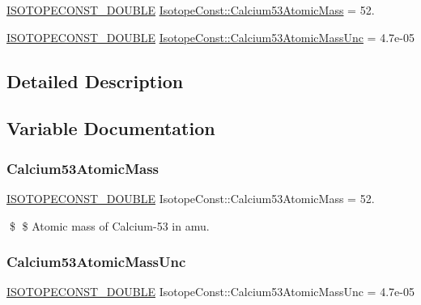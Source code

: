 \begin{DoxyCompactItemize}
\item 
\mbox{\hyperlink{group___isotope_const-_macros_ga8f45a7272ce02c0b4c65c44636ed719a}{I\+S\+O\+T\+O\+P\+E\+C\+O\+N\+S\+T\+\_\+\+D\+O\+U\+B\+LE}} \mbox{\hyperlink{group___isotope_const-_calcium-_ca53_ga8e71eb7b353aab0e8ed5a5073c9630cb}{Isotope\+Const\+::\+Calcium53\+Atomic\+Mass}} = 52.
\item 
\mbox{\hyperlink{group___isotope_const-_macros_ga8f45a7272ce02c0b4c65c44636ed719a}{I\+S\+O\+T\+O\+P\+E\+C\+O\+N\+S\+T\+\_\+\+D\+O\+U\+B\+LE}} \mbox{\hyperlink{group___isotope_const-_calcium-_ca53_ga5c5bef984e604d365d8e1a755ed00408}{Isotope\+Const\+::\+Calcium53\+Atomic\+Mass\+Unc}} = 4.\+7e-\/05
\end{DoxyCompactItemize}


\subsection{Detailed Description}


\subsection{Variable Documentation}
\mbox{\label{group___isotope_const-_calcium-_ca53_ga8e71eb7b353aab0e8ed5a5073c9630cb}} 
\subsubsection{\texorpdfstring{Calcium53\+Atomic\+Mass}{Calcium53AtomicMass}}
{\footnotesize\ttfamily \mbox{\hyperlink{group___isotope_const-_macros_ga8f45a7272ce02c0b4c65c44636ed719a}{I\+S\+O\+T\+O\+P\+E\+C\+O\+N\+S\+T\+\_\+\+D\+O\+U\+B\+LE}} Isotope\+Const\+::\+Calcium53\+Atomic\+Mass = 52.}

\$ \$ Atomic mass of Calcium-\/53 in amu. \mbox{\label{group___isotope_const-_calcium-_ca53_ga5c5bef984e604d365d8e1a755ed00408}} 
\subsubsection{\texorpdfstring{Calcium53\+Atomic\+Mass\+Unc}{Calcium53AtomicMassUnc}}
{\footnotesize\ttfamily \mbox{\hyperlink{group___isotope_const-_macros_ga8f45a7272ce02c0b4c65c44636ed719a}{I\+S\+O\+T\+O\+P\+E\+C\+O\+N\+S\+T\+\_\+\+D\+O\+U\+B\+LE}} Isotope\+Const\+::\+Calcium53\+Atomic\+Mass\+Unc = 4.\+7e-\/05}

